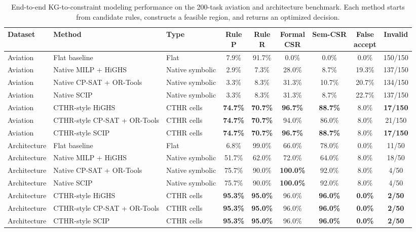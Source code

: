 ﻿\documentclass[a4paper,fleqn]{cas-dc}
\newcommand{\CTHR}{\textsc{CTHR}}
\begin{document}
\begin{table}[t]
\centering
\caption{End-to-end KG-to-constraint modeling performance on the 200-task
aviation and architecture benchmark. Each method starts from candidate rules,
constructs a feasible region, and returns an optimized decision.}
\label{tab:overall_pipeline}
\scriptsize
\setlength{\tabcolsep}{3pt}
\begin{tabularx}{\textwidth}{p{}p{}p{}cccccc}
\toprule
Dataset & Method & Type & \shortstack{Rule\\P} & \shortstack{Rule\\R} &
\shortstack{Formal\\CSR} & Sem-CSR & \shortstack{False\\accept} & Invalid \\
\midrule
Aviation & Flat baseline & Flat & 7.9\% & 91.7\% & 0.0\% & 0.0\% & 0.0\% & 150/150 \\
Aviation & Native MILP + HiGHS & Native symbolic & 2.9\% & 7.3\% & 28.0\% & 8.7\% & 19.3\% & 137/150 \\
Aviation & Native CP-SAT + OR-Tools & Native symbolic & 3.3\% & 8.3\% & 31.3\% & 10.7\% & 20.7\% & 134/150 \\
Aviation & Native SCIP & Native symbolic & 3.3\% & 8.3\% & 31.3\% & 8.7\% & 22.7\% & 137/150 \\
Aviation & \CTHR{}-style HiGHS & \CTHR{} cells & \textbf{74.7\%} & \textbf{70.7\%} & \textbf{96.7\%} & \textbf{88.7\%} & 8.0\% & \textbf{17/150} \\
Aviation & \CTHR{}-style CP-SAT + OR-Tools & \CTHR{} cells & \textbf{74.7\%} & \textbf{70.7\%} & 94.0\% & 86.0\% & 8.0\% & 21/150 \\
Aviation & \CTHR{}-style SCIP & \CTHR{} cells & \textbf{74.7\%} & \textbf{70.7\%} & \textbf{96.7\%} & \textbf{88.7\%} & 8.0\% & \textbf{17/150} \\
\midrule
Architecture & Flat baseline & Flat & 6.8\% & 99.0\% & 66.0\% & 78.0\% & 0.0\% & 11/50 \\
Architecture & Native MILP + HiGHS & Native symbolic & 51.7\% & 62.0\% & 72.0\% & 64.0\% & 8.0\% & 18/50 \\
Architecture & Native CP-SAT + OR-Tools & Native symbolic & 75.7\% & 90.0\% & \textbf{100.0\%} & 92.0\% & 8.0\% & 4/50 \\
Architecture & Native SCIP & Native symbolic & 75.7\% & 90.0\% & \textbf{100.0\%} & 92.0\% & 8.0\% & 4/50 \\
Architecture & \CTHR{}-style HiGHS & \CTHR{} cells & \textbf{95.3\%} & \textbf{95.0\%} & 96.0\% & \textbf{96.0\%} & \textbf{0.0\%} & \textbf{2/50} \\
Architecture & \CTHR{}-style CP-SAT + OR-Tools & \CTHR{} cells & \textbf{95.3\%} & \textbf{95.0\%} & 96.0\% & \textbf{96.0\%} & \textbf{0.0\%} & \textbf{2/50} \\
Architecture & \CTHR{}-style SCIP & \CTHR{} cells & \textbf{95.3\%} & \textbf{95.0\%} & 96.0\% & \textbf{96.0\%} & \textbf{0.0\%} & \textbf{2/50} \\
\bottomrule
\end{tabularx}
\end{table}
\end{document}
